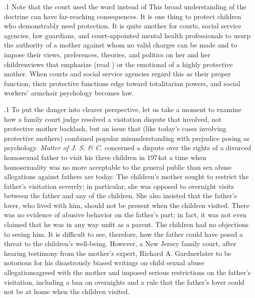 \documentclass[11pt, twoside]{article}
\begin{document}
{{}%

\p.1{%
Note that the court used the word  instead of 
This broad understanding of the doctrine can have far-reaching consequences. It is one thing to protect children who demonstrably need
protection. It is quite another for courts, social service agencies, law
guardians, and court-appointed mental health professionals to usurp
the authority of a mother against whom no valid charges can be made
and to impose their views, preferences, theories, and politics on her and
her children\mdash{}views that emphasize  (read ) or the
emotional  of a highly protective mother. When courts and social service agencies regard this as their proper function, their protective
functions edge toward totalitarian powers, and social workers’ armchair
psychology becomes law.
}%

\p.1{%
To put the danger into clearer perspective, let us take a moment to
examine how a family court judge resolved a visitation dispute that involved, not protective mother backlash, but an issue that (like today’s
cases involving protective mothers) combined popular misunderstanding with prejudice posing as psychology. \textit{Matter of J. S. \& C.} concerned
a dispute over the rights of a divorced homosexual father to visit his
three children in 1974\mdash{}at a time when homosexuality was no more acceptable to the general public than sex abuse allegations against fathers
are today. \hspace{4pt} The children’s mother sought to restrict the father’s visitation
severely; in particular, she was opposed to overnight visits between the
father and any of the children. She also insisted that the father’s lover,
who lived with him, should not be present when the children visited.
There was no evidence of abusive behavior on the father’s part; in fact,
it was not even claimed that he was in any way unfit as a parent. The
children had no objections to seeing him. It is difficult to see, therefore,
how the father could have posed a threat to the children’s well-being.
However, a New Jersey family court, after hearing testimony from the
mother’s expert, Richard A. Gardner\mdash{}later to be notorious for his disastrously biased writings on child sexual abuse allegations\mdash{}agreed with
the mother and imposed serious restrictions on the father’s visitation,
including a ban on overnights and a rule that the father’s lover could
not be at home when the children visited.
}%

}
\end{document}
